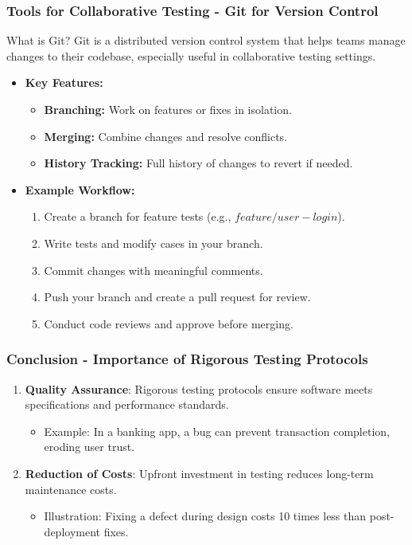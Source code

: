 \documentclass{beamer}
\begin{document}
\begin{frame}[fragile]
    \frametitle{Tools for Collaborative Testing - Git for Version Control}
    \begin{block}{What is Git?}
        Git is a distributed version control system that helps teams manage changes to their codebase, especially useful in collaborative testing settings.
    \end{block}
    \begin{itemize}
        \item \textbf{Key Features:}
        \begin{itemize}
            \item \textbf{Branching:} Work on features or fixes in isolation.
            \item \textbf{Merging:} Combine changes and resolve conflicts.
            \item \textbf{History Tracking:} Full history of changes to revert if needed.
        \end{itemize}
        \item \textbf{Example Workflow:}
        \begin{enumerate}
            \item Create a branch for feature tests (e.g., $feature/user-login$).
            \item Write tests and modify cases in your branch.
            \item Commit changes with meaningful comments.
            \item Push your branch and create a pull request for review.
            \item Conduct code reviews and approve before merging.
        \end{enumerate}
    \end{itemize}
\end{frame}

\begin{frame}[fragile]
    \frametitle{Conclusion - Importance of Rigorous Testing Protocols}
    \begin{enumerate}
        \item \textbf{Quality Assurance}: 
        Rigorous testing protocols ensure software meets specifications and performance standards.
        \begin{itemize}
            \item Example: In a banking app, a bug can prevent transaction completion, eroding user trust.
        \end{itemize}
        
        \item \textbf{Reduction of Costs}:
        Upfront investment in testing reduces long-term maintenance costs.
        \begin{itemize}
            \item Illustration: Fixing a defect during design costs 10 times less than post-deployment fixes.
        \end{itemize}
    \end{enumerate}
\end{frame}
\end{document}
